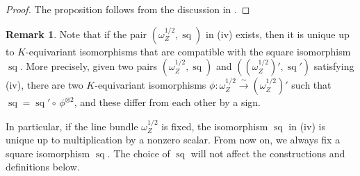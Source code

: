 \documentclass[11pt, a4paper]{amsart}
\DeclareMathOperator{\sq}{sq}
\newcommand{\smallhalf}{{\scriptscriptstyle 1/2}}
\theoremstyle{definition}
\newtheorem{Rem}[Thm]{Remark}
\numberwithin{equation}{section}
\begin{document}
\begin{proof}
	The proposition follows from the discussion in \cite[Section 2.4.2]{Yu:period}.
\end{proof}

\begin{Rem} \label{rem:omega_half}
    Note that if the pair $(\omega_Z^{\smallhalf}, \sq)$ in  (iv) exists, then it is unique up to $K$-equivariant isomorphisms that are compatible with the square isomorphism $\sq$. More precisely, given two pairs $(\omega_Z^{\smallhalf}, \sq)$ and $((\omega_Z^{\smallhalf})', \sq')$ satisfying  (iv), there are two $K$-equivariant isomorphisms $\phi: \omega_Z^{\smallhalf} \xrightarrow{\sim} (\omega_Z^{\smallhalf})'$ such that $\sq = \sq' \circ \,\phi^{\otimes 2}$, and these differ from each other by a sign.
	
	In particular, if the line bundle $\omega_Z^{\smallhalf}$ is fixed, the isomorphism $\sq$ in  (iv) is unique up to multiplication by a nonzero scalar. From now on, we always fix a square isomorphism $\sq$. The choice of $\sq$ will not affect the constructions and definitions below.
\end{Rem}
\end{document}
